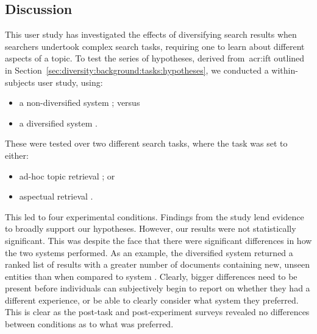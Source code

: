 \vspace*{-6mm}
\subsection{Discussion}\label{sec:diversity:users:discussion}
This user study has investigated the effects of diversifying search results when searchers undertook complex search tasks, requiring one to learn about different aspects of a topic. To test the series of hypotheses, derived from~\gls{acr:ift} outlined in Section~\ref{sec:diversity:background:tasks:hypotheses}, we conducted a within-subjects user study, using:

\begin{itemize}
    \item{a non-diversified system ; versus}
    \item{a diversified system .}
\end{itemize}

These were tested over two different search tasks, where the task was set to either:

\begin{itemize}
    \item{ad-hoc topic retrieval ; or}
    \item{aspectual retrieval .}
\end{itemize}

This led to four experimental conditions. Findings from the study lend evidence to broadly support our hypotheses. However, our results were not statistically significant. This was despite the face that there were significant differences in how the two systems performed. As an example, the diversified system  returned a ranked list of results with a greater number of documents containing new, unseen entities than when compared to system . Clearly, bigger differences need to be present before individuals can subjectively begin to report on whether they had a different experience, or be able to clearly consider what system they preferred. This is clear as the post-task and post-experiment surveys revealed no differences between conditions as to what was preferred.

